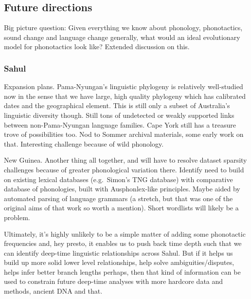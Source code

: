 \hypertarget{future-directions}{%
\subsection{Future directions}\label{future-directions}}

Big picture question: Given everything we know about phonology, phonotactics, sound change and language change generally, what would an ideal evolutionary model for phonotactics look like? Extended discussion on this.

\hypertarget{sahul}{%
\subsubsection{Sahul}\label{sahul}}

Expansion plans. Pama-Nyungan's linguistic phylogeny is relatively well-studied now in the sense that we have large, high quality phylogeny which has calibrated dates and the geographical element. This is still only a subset of Australia's linguistic diversity though. Still tons of undetected or weakly supported links between non-Pama-Nyungan language families. Cape York still has a treasure trove of possibilities too. Nod to Sommer archival materials, some early work on that. Interesting challenge because of wild phonology.

New Guinea. Another thing all together, and will have to resolve dataset sparsity challenges because of greater phonological variation there. Identify need to build on existing lexical databases (e.g.~Simon's TNG database) with comparative database of phonologies, built with Ausphonlex-like principles. Maybe aided by automated parsing of language grammars (a stretch, but that was one of the original aims of that work so worth a mention). Short wordlists will likely be a problem.

Ultimately, it's highly unlikely to be a simple matter of adding some phonotactic frequencies and, hey presto, it enables us to push back time depth such that we can identify deep-time linguistic relationships across Sahul. But if it helps us build up more solid lower level relationships, help solve ambiguities/disputes, helps infer better branch lengths perhaps, then that kind of information can be used to constrain future deep-time analyses with more hardcore data and methods, ancient DNA and that.

